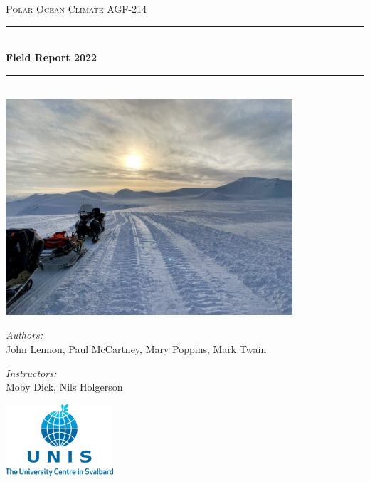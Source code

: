 \begin{titlepage}		%

  \setcounter{page}{-1}			%

\begin{center}



\textsc{\Large Polar Ocean Climate AGF-214}\\[0.5cm]


\newcommand{\HRule}{\rule{\linewidth}{0.5mm}}
\HRule \\[0.4cm]
{ \huge \bfseries Field Report 2022}\\
\HRule \\[1.5cm]
\includegraphics[width=0.8\textwidth]{./figures_main/cover_image} %

\vfill


\emph{Authors:}\\
John Lennon, Paul McCartney, Mary Poppins, Mark Twain

\vspace{1cm}

\emph{Instructors:}\\
Moby Dick, Nils Holgerson


\vfill

\includegraphics[width=0.3\textwidth]{./figures_main/unis_logo}

\end{center}

\newpage
\thispagestyle{empty}			%

\end{titlepage}

